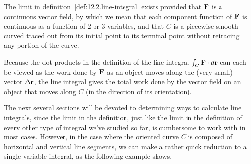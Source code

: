 \vspace*{5pt}
\nin {} \vspace*{5pt}

The limit in definition~\ref{def:12.2.line-integral} exists provided
that $\mathbf{F}$ is a continuous vector field, by which we mean that each
component function of $\mathbf{F}$ is continuous as a function of $2$ or $3$
variables, and that $C$ is a piecewise smooth curved traced out from
its initial point to its terminal point without retracing any portion
of the curve.

Because the dot products in the definition of the line integral
$\int_C\mathbf{F}\cdot d\mathbf{r}$ can each be viewed as the work done by $\mathbf{F}$ as
an object moves along the (very small) vector $\Delta\mathbf{r}$, the line
integral gives the total work done by the vector field on an object
that moves along $C$ (in the direction of its orientation).



The next several sections will be devoted to determining ways to
calculate line integrals, since the limit in the definition, just like
the limit in the definition of every other type of integral we've
studied so far, is cumbersome to work with in most cases. However, in
the case where the oriented curve $C$ is composed of horizontal and
vertical line segments, we can make a rather quick reduction to a
single-variable integral, as the following example shows.


